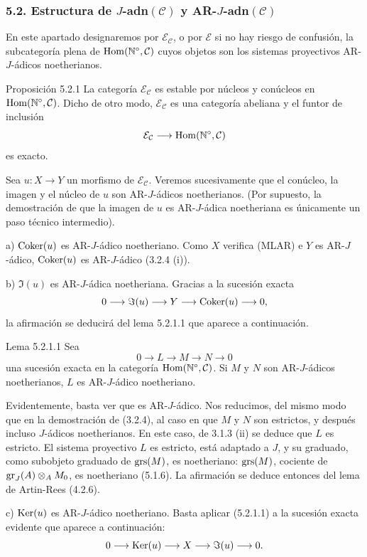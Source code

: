 \subsubsection*{5.2. Estructura de \(J\)-adn\((\mathcal C)\) y AR-\(J\)-adn\((\mathcal C)\)}

En este apartado designaremos por \(\mathcal E_{\mathcal C}\), o por \(\mathcal E\) si no hay riesgo de confusión, la subcategoría plena de \(\operatorname{Hom}(\mathbb N^\circ,\mathcal C)\) cuyos objetos son los sistemas proyectivos AR-\(J\)-ádicos noetherianos.

\begin{statement}{Proposición 5.2.1}
La categoría \(\mathcal E_{\mathcal C}\) es estable por núcleos y conúcleos en \(\operatorname{Hom}(\mathbb N^\circ,\mathcal C)\). Dicho de otro modo, \(\mathcal E_{\mathcal C}\) es una categoría abeliana y el funtor de inclusión
\[
\mathcal E_{\mathcal C}\longrightarrow \operatorname{Hom}(\mathbb N^\circ,\mathcal C)
\]
es exacto.
\end{statement}

\begin{prooftext}
Sea \(u:X\to Y\) un morfismo de \(\mathcal E_{\mathcal C}\). Veremos sucesivamente que el conúcleo, la imagen y el núcleo de \(u\) son AR-\(J\)-ádicos noetherianos. (Por supuesto, la demostración de que la imagen de \(u\) es AR-\(J\)-ádica noetheriana es únicamente un paso técnico intermedio).

a) \(\operatorname{Coker}(u)\) es AR-\(J\)-ádico noetheriano. Como \(X\) verifica (MLAR) e \(Y\) es AR-\(J\)-ádico, \(\operatorname{Coker}(u)\) es AR-\(J\)-ádico (3.2.4 (i)).

b) \(\Im(u)\) es AR-\(J\)-ádica noetheriana. Gracias a la sucesión exacta
\[
0\longrightarrow \Im(u)\longrightarrow Y\longrightarrow \operatorname{Coker}(u)\longrightarrow 0,
\]
la afirmación se deducirá del lema 5.2.1.1 que aparece a continuación.
\end{prooftext}

\begin{statement}{Lema 5.2.1.1}
Sea
\[
0\longrightarrow L\longrightarrow M\longrightarrow N\longrightarrow0
\]
una sucesión exacta en la categoría \(\operatorname{Hom}(\mathbb N^\circ,\mathcal C)\). Si \(M\) y \(N\) son AR-\(J\)-ádicos noetherianos, \(L\) es AR-\(J\)-ádico noetheriano.
\end{statement}

\begin{prooftext}
Evidentemente, basta ver que es AR-\(J\)-ádico. Nos reducimos, del mismo modo que en la demostración de (3.2.4), al caso en que \(M\) y \(N\) son estrictos, y después incluso \(J\)-ádicos noetherianos. En este caso, de 3.1.3 (ii) se deduce que \(L\) es estricto. El sistema proyectivo \(L\) es estricto, está adaptado a \(J\), y su graduado, como subobjeto graduado de \(\operatorname{grs}(M)\), es noetheriano: \(\operatorname{grs}(M)\), cociente de \(\operatorname{gr}_J(A)\otimes_A M_0\), es noetheriano (5.1.6). La afirmación se deduce entonces del lema de Artin-Rees (4.2.6).
\end{prooftext}

c) \(\operatorname{Ker}(u)\) es AR-\(J\)-ádico noetheriano. Basta aplicar (5.2.1.1) a la sucesión exacta evidente que aparece a continuación:
\[
0\longrightarrow \operatorname{Ker}(u)\longrightarrow X\longrightarrow \Im(u)\longrightarrow0.
\]
